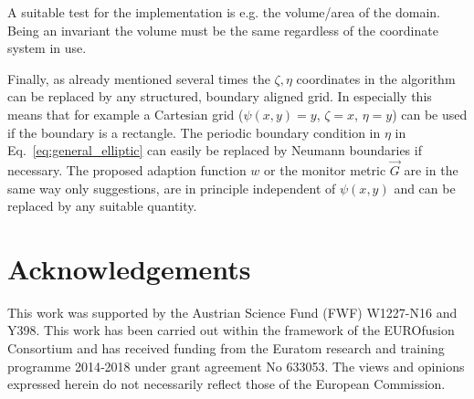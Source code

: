 A suitable test for the implementation is e.g. the volume/area of the domain. 
Being an invariant
the volume must be the same regardless of the coordinate system in use. 

Finally, as already mentioned several times the $\zeta,\eta$ coordinates in the algorithm can 
be replaced by any structured, boundary aligned grid. In especially this means
that for example a Cartesian grid ($\psi(x,y) = y$, $\zeta=x$, $\eta=y$) 
can be used if the boundary 
is a rectangle. The periodic boundary condition in $\eta$ in Eq.~\eqref{eq:general_elliptic} can easily be replaced 
by Neumann boundaries if necessary. 
The proposed adaption function $w$ or the monitor metric $\vec G$
are in the same way only suggestions, are in principle independent of $\psi(x,y)$ and can be replaced by any suitable quantity. 








\section*{Acknowledgements} 	
This work was supported by the Austrian Science Fund (FWF) W1227-N16 and Y398. 
This work has been carried out within the framework of the EUROfusion Consortium and has received funding from the Euratom research and training programme 2014‐2018 under grant agreement No 633053. The views and opinions expressed herein do not necessarily reflect those of the European Commission.








